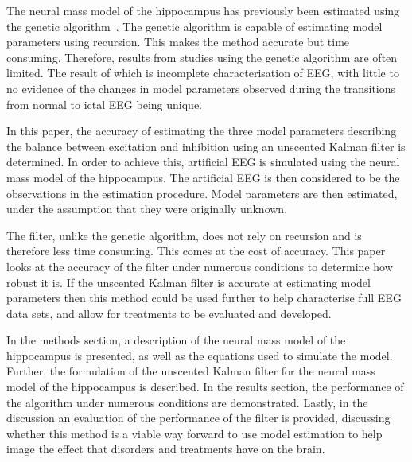 
The neural mass model of the hippocampus has previously been estimated using the genetic algorithm~\citep{wendling2005interictal}. The genetic algorithm is capable of estimating model parameters using recursion. This makes the method accurate but time consuming. Therefore, results from studies using the genetic algorithm are often limited. The result of which is incomplete characterisation of EEG, with little to no evidence of the changes in model parameters observed during the transitions from normal to ictal EEG being unique.





In this paper, the accuracy of estimating the three model parameters describing the balance between excitation and inhibition using an unscented Kalman filter is determined. In order to achieve this, artificial EEG is simulated using the neural mass model of the hippocampus. The artificial EEG is then considered to be the observations in the estimation procedure. Model parameters are then estimated, under the assumption that they were originally unknown.

The filter, unlike the genetic algorithm, does not rely on recursion and is therefore less time consuming. This comes at the cost of accuracy. This paper looks at the accuracy of the filter under numerous conditions to determine how robust it is. If the unscented Kalman filter is accurate at estimating model parameters then this method could be used further to help characterise full EEG data sets, and allow for treatments to be evaluated and developed.

In the methods section, a description of the neural mass model of the hippocampus is presented, as well as the equations used to simulate the model. Further, the formulation of the unscented Kalman filter for the neural mass model of the hippocampus is described. In the results section, the performance of the algorithm under numerous conditions are demonstrated. Lastly, in the discussion an evaluation of the performance of the filter is provided, discussing whether this method is a viable way forward to use model estimation to help image the effect that disorders and treatments have on the brain. 